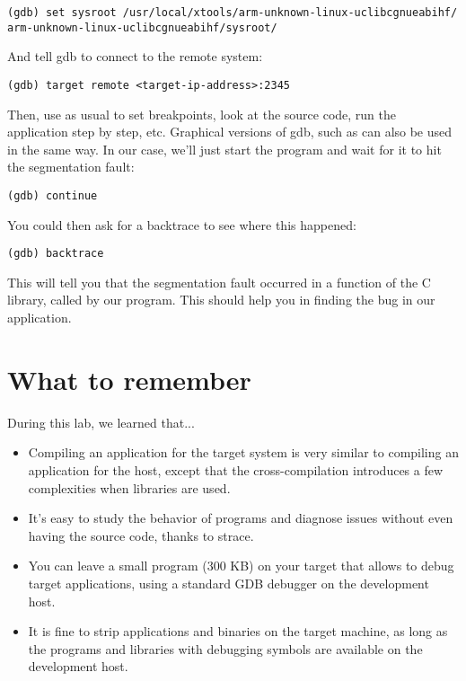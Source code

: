\begin{verbatim}
(gdb) set sysroot /usr/local/xtools/arm-unknown-linux-uclibcgnueabihf/
arm-unknown-linux-uclibcgnueabihf/sysroot/
\end{verbatim}

And tell gdb to connect to the remote system:
\begin{verbatim}
(gdb) target remote <target-ip-address>:2345
\end{verbatim}

Then, use  as usual to set breakpoints, look at the source
code, run the application step by step, etc. Graphical versions of
gdb, such as  can also be used in the same way. In our case,
we'll just start the program and wait for it to hit the segmentation
fault:
\begin{verbatim}
(gdb) continue
\end{verbatim}

You could then ask for a backtrace to see where this happened:
\begin{verbatim}
(gdb) backtrace
\end{verbatim}

This will tell you that the segmentation fault occurred in a function
of the C library, called by our program. This should help you in
finding the bug in our application.

\section{What to remember}

During this lab, we learned that...
\begin{itemize}
\item Compiling an application for the target system is very similar
  to compiling an application for the host, except that the
  cross-compilation introduces a few complexities when libraries are
  used.

\item It's easy to study the behavior of programs and diagnose issues
  without even having the source code, thanks to strace.

\item You can leave a small  program (300 KB) on your target
  that allows to debug target applications, using a standard GDB
  debugger on the development host.

\item It is fine to strip applications and binaries on the target
  machine, as long as the programs and libraries with debugging
  symbols are available on the development host.

\end{itemize}

